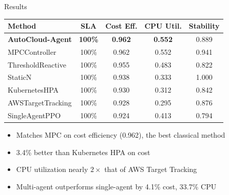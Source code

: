 \documentclass[aspectratio=169,11pt]{beamer}
\begin{document}
\begin{frame}{Results}
\begin{center}
\begin{tabular}{lcccc}
\toprule
\textbf{Method} & \textbf{SLA} & \textbf{Cost Eff.} & \textbf{CPU Util.} & \textbf{Stability} \\
\midrule
\textbf{AutoCloud-Agent} & \textbf{100\%} & \textbf{0.962} & \textbf{0.552} & 0.889 \\
MPCController & 100\% & 0.962 & 0.552 & 0.941 \\
ThresholdReactive & 100\% & 0.955 & 0.483 & 0.822 \\
StaticN & 100\% & 0.938 & 0.333 & 1.000 \\
KubernetesHPA & 100\% & 0.930 & 0.312 & 0.842 \\
AWSTargetTracking & 100\% & 0.928 & 0.295 & 0.876 \\
SingleAgentPPO & 100\% & 0.924 & 0.413 & 0.794 \\
\bottomrule
\end{tabular}
\end{center}

\vspace{0.3cm}
\begin{itemize}
  \item Matches MPC on cost efficiency (0.962), the best classical method
  \item 3.4\% better than Kubernetes HPA on cost
  \item CPU utilization nearly $2\times$ that of AWS Target Tracking
  \item Multi-agent outperforms single-agent by 4.1\% cost, 33.7\% CPU
\end{itemize}
\end{frame}
\end{document}

